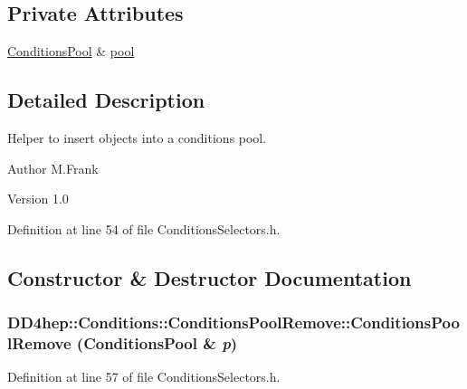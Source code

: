 \subsection*{Private Attributes}
\begin{DoxyCompactItemize}
\item 
\hyperlink{class_d_d4hep_1_1_conditions_1_1_conditions_pool}{ConditionsPool} \& \hyperlink{class_d_d4hep_1_1_conditions_1_1_conditions_pool_remove_a8db5c24da51ce1a590146387c3ab0c3b}{pool}
\end{DoxyCompactItemize}


\subsection{Detailed Description}
Helper to insert objects into a conditions pool. \begin{DoxyAuthor}{Author}
M.Frank 
\end{DoxyAuthor}
\begin{DoxyVersion}{Version}
1.0 
\end{DoxyVersion}


Definition at line 54 of file ConditionsSelectors.h.

\subsection{Constructor \& Destructor Documentation}
\hypertarget{class_d_d4hep_1_1_conditions_1_1_conditions_pool_remove_abc0edc988a0117b97e68d824cb07da9c}{
\subsubsection[{ConditionsPoolRemove}]{\setlength{\rightskip}{0pt plus 5cm}DD4hep::Conditions::ConditionsPoolRemove::ConditionsPoolRemove ({\bf ConditionsPool} \& {\em p})}}
\label{class_d_d4hep_1_1_conditions_1_1_conditions_pool_remove_abc0edc988a0117b97e68d824cb07da9c}


Definition at line 57 of file ConditionsSelectors.h.

